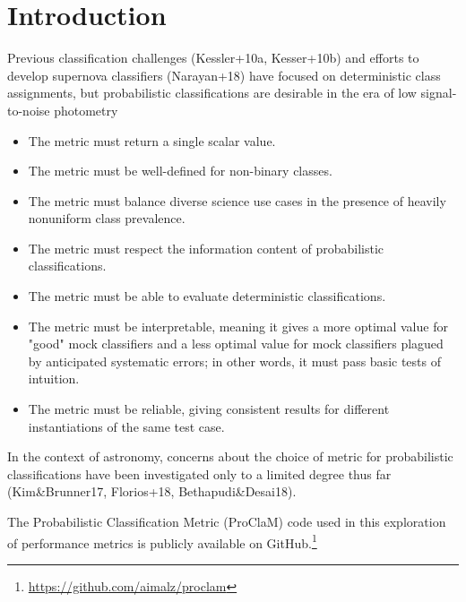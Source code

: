 \section{Introduction}
\label{sec:intro}



Previous classification challenges (Kessler+10a, Kesser+10b) and efforts to develop supernova classifiers (Narayan+18) have focused on deterministic class assignments, but probabilistic classifications are desirable in the era of low signal-to-noise photometry

\begin{itemize}
\item    The metric must return a single scalar value.
\item    The metric must be well-defined for non-binary classes.
\item    The metric must balance diverse science use cases in the presence of heavily nonuniform class prevalence.
\item    The metric must respect the information content of probabilistic classifications.
\item    The metric must be able to evaluate deterministic classifications.
\item    The metric must be interpretable, meaning it gives a more optimal value for "good" mock classifiers and a less optimal value for mock classifiers plagued by anticipated systematic errors; in other words, it must pass basic tests of intuition.
\item    The metric must be reliable, giving consistent results for different instantiations of the same test case.
\end{itemize}

In the context of astronomy, concerns about the choice of metric for probabilistic classifications have been investigated only to a limited degree thus far (Kim\&Brunner17, Florios+18, Bethapudi\&Desai18).

The Probabilistic Classification Metric (ProClaM) code used in this exploration of performance metrics is publicly available on GitHub.\footnote{\url{https://github.com/aimalz/proclam}}
